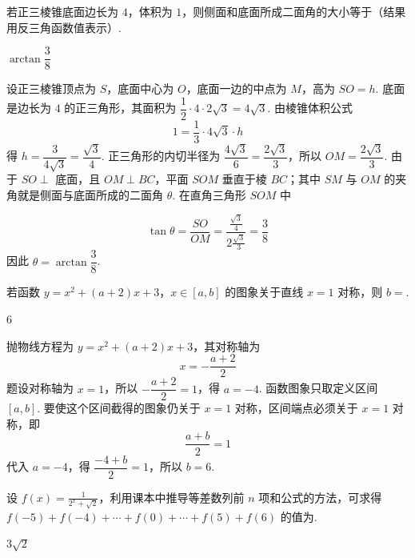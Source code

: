 \begin{problem}
若正三棱锥底面边长为 \(4\)，体积为 \(1\)，则侧面和底面所成二面角的大小等于\fillinblank{}（结果用反三角函数值表示）.
\end{problem}

\begin{answer}
\(\arctan\dfrac{3}{8}\)
\end{answer}

\begin{solution}
设正三棱锥顶点为 \(S\)，底面中心为 \(O\)，底面一边的中点为 \(M\)，高为 \(SO=h\). 底面是边长为 \(4\) 的正三角形，其面积为 \(\dfrac{1}{2}\cdot4\cdot2\sqrt{3}=4\sqrt{3}\). 由棱锥体积公式
\[
1=\frac{1}{3}\cdot4\sqrt{3}\cdot h
\]
得 \(h=\dfrac{3}{4\sqrt{3}}=\dfrac{\sqrt{3}}{4}\). 正三角形的内切半径为 \(\dfrac{4\sqrt{3}}{6}=\dfrac{2\sqrt{3}}{3}\)，所以 \(OM=\dfrac{2\sqrt{3}}{3}\). 由于 \(SO\perp\) 底面，且 \(OM\perp BC\)，平面 \(SOM\) 垂直于棱 \(BC\)；其中 \(SM\) 与 \(OM\) 的夹角就是侧面与底面所成的二面角 \(\theta\). 在直角三角形 \(SOM\) 中

\[
\tan\theta=\frac{SO}{OM}=\frac{\frac{\sqrt{3}}{4}}{2\frac{\sqrt{3}}{3}}=\frac{3}{8}
\]
因此 \(\theta=\arctan\dfrac{3}{8}\).
\end{solution}

\begin{problem}
若函数 \( y = x^{2} + (a + 2)x + 3 \)，\( x \in [a,b] \) 的图象关于直线 \( x = 1 \) 对称，则 \( b = \)\fillinblank{}.
\end{problem}

\begin{answer}
\(6\)
\end{answer}

\begin{solution}
抛物线方程为 \(y=x^2+(a+2)x+3\)，其对称轴为
\[
x=-\frac{a+2}{2}
\]
题设对称轴为 \(x=1\)，所以 \(-\dfrac{a+2}{2}=1\)，得 \(a=-4\). 函数图象只取定义区间 \([a,b]\). 要使这个区间截得的图象仍关于 \(x=1\) 对称，区间端点必须关于 \(x=1\) 对称，即
\[
\frac{a+b}{2}=1
\]
代入 \(a=-4\)，得 \(\dfrac{-4+b}{2}=1\)，所以 \(b=6\).
\end{solution}

\begin{problem}
设 \( f(x) = \frac{1}{2^{x} + \sqrt{2}} \)，利用课本中推导等差数列前 \(n\) 项和公式的方法，可求得 \( f(-5) + f(-4) + \cdots + f(0) + \cdots + f(5) + f(6) \) 的值为\fillinblank{}.
\end{problem}

\begin{answer}
\(3\sqrt{2}\)
\end{answer}

